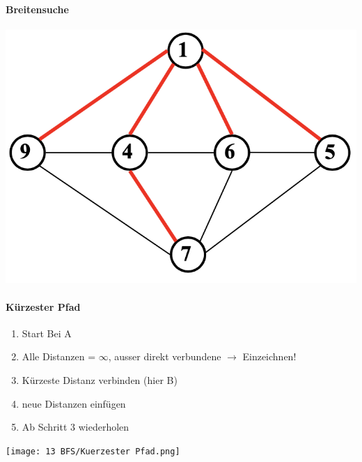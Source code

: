 \paragraph{Breitensuche}
\begin{center}
    \includegraphics[scale=.25]{graphic/13 BFS/breitensuche.png}
\end{center}

\paragraph{Kürzester Pfad}
\begin{enumerate}
    \item Start Bei A
    \item Alle Distanzen = $\infty$, ausser direkt verbundene $\rightarrow$ Einzeichnen!
    \item Kürzeste Distanz verbinden (hier B)
    \item neue Distanzen einfügen
    \item Ab Schritt 3 wiederholen
\end{enumerate}
\begin{center}
    \texttt{[image: 13 BFS/Kuerzester Pfad.png]}
\end{center}
\newpage